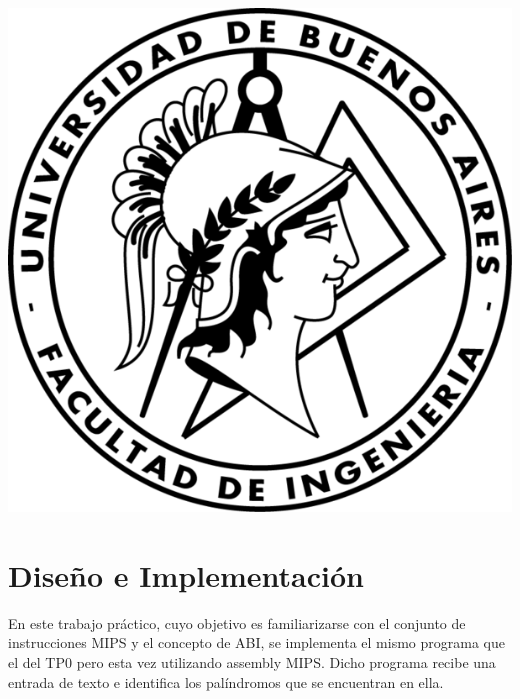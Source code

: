 \documentclass[a4paper, 10pt]{article}
\begin{document}
    \newpage

    \begin{center}
        \includegraphics{images/logo}
    \end{center}


    \maketitle
    \newpage
    \tableofcontents
    \newpage
	\section{Diseño e Implementación}
		En este trabajo práctico, cuyo objetivo es familiarizarse con el conjunto de 
		instrucciones MIPS y el concepto de ABI, 
		se implementa el mismo programa que el del TP0 pero esta vez utilizando assembly MIPS. 
		Dicho programa recibe una entrada de texto e identifica los palíndromos que se encuentran en
		ella.
\end{document}
